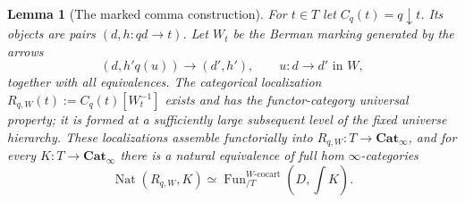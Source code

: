\documentclass[oneside]{article}
\theoremstyle{plain}
\newtheorem{lemma}[theorem]{Lemma}
\theoremstyle{definition}
\theoremstyle{remark}
\newcommand{\Cat}{\mathbf{Cat}_{\infty}}
\newcommand{\Fun}{\operatorname{Fun}}
\newcommand{\Nat}{\operatorname{Nat}}
\newcommand{\coc}{\mathrm{cocart}}
\begin{document}
\begin{lemma}[The marked comma construction]\label{thz:lem:comma}
For $t\in T$ let $C_q(t)=q\downarrow t$.  Its objects are pairs
$(d,h:qd\to t)$.  Let $W_t$ be the Berman marking generated by the
arrows
\begin{equation}\label{thz:eq:Wt}
 (d,h'q(u))\longrightarrow(d',h'),
 \qquad u:d\to d'\text{ in }W,
\end{equation}
together with all equivalences.  The categorical localization $R_{q,W}(t):=C_q(t)[W_t^{-1}]$ exists and has the functor-category universal property; it is formed
at a sufficiently large subsequent level of the fixed universe hierarchy.\cite[\S6.3]{Kerodon}
These localizations assemble functorially into
$R_{q,W}:T\to\Cat$, and for every
$K:T\to\Cat$ there is a natural equivalence of full hom $\infty$-categories
\begin{equation}\label{thz:eq:comma-UP}
 \Nat(R_{q,W},K)
 \simeq
 \Fun^{W\text{-}\coc}_{/T}
   (D,\textstyle\int K).
\end{equation}
\end{lemma}
\end{document}
